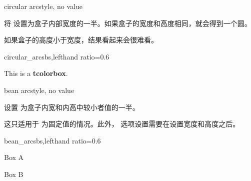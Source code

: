 \begin{docTcbKey}[][doc new=2015-05-05]{circular arc}{}{style, no value}
  
  将  设置为盒子内部宽度的一半。如果盒子的宽度和高度相同，就会得到一个圆。
  \begin{marker}
  
  如果盒子的高度小于宽度，结果看起来会很难看。   
  \end{marker}
  \begin{exdispExample*}{circular_arc}{sbs,lefthand ratio=0.6}
  \begin{tcolorbox}[width=3cm,
  colback=red!5!white,
  colframe=red!75!black,
  halign=center,valign=center,
  square,circular arc]
  This is a \textbf{tcolorbox}.
  \end{tcolorbox}
  \end{exdispExample*}
  \end{docTcbKey}
  
  
  \begin{docTcbKey}[][doc new=2015-05-05]{bean arc}{}{style, no value}
  
  设置  为盒子内宽和内高中较小者值的一半。
  
  \begin{marker}
  
  这只适用于  为固定值的情况。此外， 选项设置需要在设置宽度和高度之后。
  \end{marker}
  \begin{exdispExample*}{bean_arc}{sbs,lefthand ratio=0.6}
  
  \begin{tcolorbox}[width=3cm,height=2cm,
  bean arc]
  Box A
  \end{tcolorbox}
  
  \begin{tcolorbox}[width=2cm,height=3cm,
  bean arc]
  Box B
  \end{tcolorbox}
  \end{exdispExample*}
  \end{docTcbKey}
  
